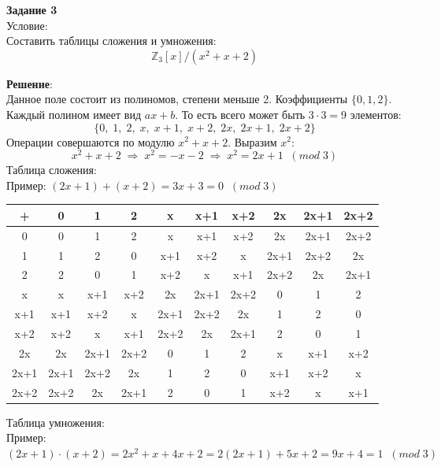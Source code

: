 \documentclass[12pt]{article}
\begin{document}
\newpage


\begin{flushleft}
    \textbf{Задание 3} \\
    Условие: \\
    Составить таблицы сложения и умножения: \\
    \[ \mathbb{Z}_3[x]/(x^2 + x + 2) \]
    
    \vspace{20pt}
    \textbf{Решение}: \\
    Данное поле состоит из полиномов, степени меньше 2. Коэффициенты $\{0, 1, 2\}$. 
    Каждый полином имеет вид $ax + b$. То есть всего может быть $3 \cdot 3 = 9$  элементов:
    \[\{0, \; 1, \; 2, \; x, \; x+1, \; x+2, \; 2x, \; 2x + 1, \; 2x + 2\} \]
    Операции совершаются по модулю $x^2 + x + 2$. Выразим $x^2$:
    \[ x^2 + x + 2 \; \Rightarrow \; x^2 = -x - 2 \; \Rightarrow \; x^2 = 2x + 1 \; \; (mod \; 3) \]
    Таблица сложения: \\
    Пример: $(2x+1) + (x+2) = 3x + 3 = 0 \; \; (mod \; 3)$ \\ 

    \begin{table}[h]
        \centering
        \renewcommand{\arraystretch}{1.2}
    \begin{tabular}{c|c|c|c|c|c|c|c|c|c}
        + & 0 & 1 & 2 & x & x+1 & x+2 & 2x & 2x+1 & 2x+2 \\
        \hline
        0 & 0 & 1 & 2 & x & x+1 & x+2 & 2x & 2x+1 & 2x+2 \\
        1 & 1 & 2 & 0 & x+1 & x+2 & x & 2x+1 & 2x+2 & 2x \\
        2 & 2 & 0 & 1 & x+2 & x & x+1 & 2x+2 & 2x & 2x+1 \\
        x & x & x+1 & x+2 & 2x & 2x+1 & 2x+2 & 0 & 1 & 2 \\
        x+1 & x+1 & x+2 & x & 2x+1 & 2x+2 & 2x & 1 & 2 & 0 \\
        x+2 & x+2 & x & x+1 & 2x+2 & 2x & 2x+1 & 2 & 0 & 1 \\
        2x & 2x & 2x+1 & 2x+2 & 0 & 1 & 2 & x & x+1 & x+2 \\
        2x+1 & 2x+1 & 2x+2 & 2x & 1 & 2 & 0 & x+1 & x+2 & x \\
        2x+2 & 2x+2 & 2x & 2x+1 & 2 & 0 & 1 & x+2 & x & x+1 \\
    \end{tabular}
    \end{table}

        
    Таблица умножения: \\
    Пример: $(2x+1) \cdot (x+2) = 2x^2 + x + 4x + 2 = 2(2x + 1) + 5x + 2 = 9x + 4 = 1 \; \; (mod \; 3) $ \\


\end{flushleft}
\end{document}
